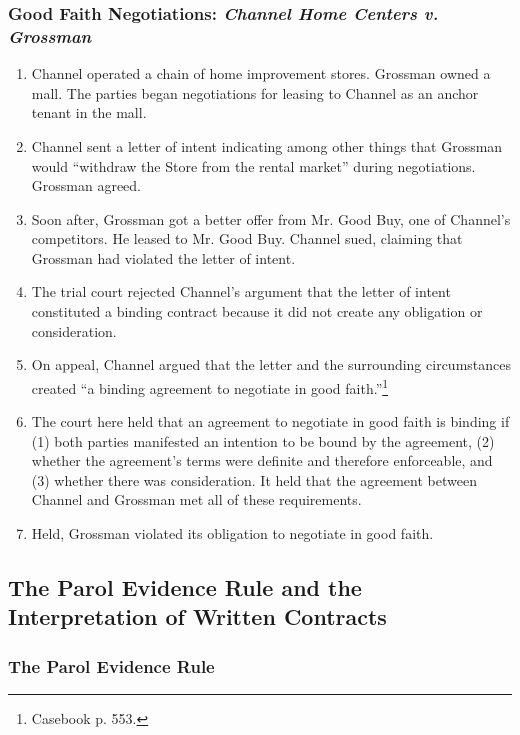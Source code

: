 \subsubsection{Good Faith Negotiations: \emph{Channel Home Centers v. 
Grossman}}

\begin{enumerate}
    \item Channel operated a chain of home improvement stores. Grossman owned 
    a mall. The parties began negotiations for leasing to Channel as an anchor 
    tenant in the mall.
    \item Channel sent a letter of intent indicating among other things that 
    Grossman would ``withdraw the Store from the rental market'' during 
    negotiations. Grossman agreed.
    \item Soon after, Grossman got a better offer from Mr. Good Buy, one of 
    Channel's competitors. He leased to Mr. Good Buy. Channel sued, claiming 
    that Grossman had violated the letter of intent.
    \item The trial court rejected Channel's argument that the letter of 
    intent constituted a binding contract because it did not create any 
    obligation or consideration.
    \item On appeal, Channel argued that the letter and the surrounding 
    circumstances created ``a binding agreement to negotiate in good 
    faith.''\footnote{Casebook p. 553.}
    \item The court here held that an agreement to negotiate in good faith is 
    binding if (1) both parties manifested an intention to be bound by the 
    agreement, (2) whether the agreement's terms were definite and therefore 
    enforceable, and (3) whether there was consideration. It held that the 
    agreement between Channel and Grossman met all of these requirements.
    \item Held, Grossman violated its obligation to negotiate in good faith.
\end{enumerate}

\subsection{The Parol Evidence Rule and the Interpretation of Written 
Contracts}

\subsubsection{The Parol Evidence Rule}

